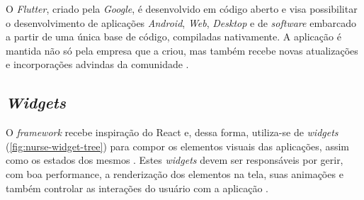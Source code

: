 O \textit{Flutter}, criado pela \textit{Google}, é desenvolvido em código aberto e visa possibilitar o desenvolvimento de aplicações \textit{Android}, \textit{Web}, \textit{Desktop} e de \textit{software} embarcado a partir de uma única base de código, compiladas nativamente. A aplicação é mantida não só pela empresa que a criou, mas também recebe novas atualizações e incorporações advindas da comunidade \cite{faq2022whatsflutter}.





\subsection{\textit{Widgets}}
\label{cap2:SubSec:Widgets}
O \textit{framework} recebe inspiração do React e, dessa forma, utiliza-se de \textit{widgets} (\ref{fig:nurse-widget-tree}) para compor os elementos visuais das aplicações, assim como os estados dos mesmos \cite{flutter2022widgets}. Estes \textit{widgets} devem ser responsáveis por gerir, com boa performance, a renderização dos elementos na tela, suas animações e também controlar as interações do usuário com a aplicação \cite{wu2018react}.

